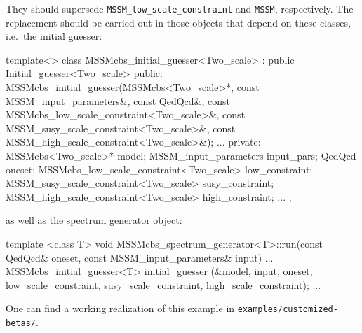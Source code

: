 \documentclass[final,3p,11pt,pdflatex]{elsarticle}
\newcommand{\code}[1]{\lstinline|#1|}  %
\begin{document}
They should supersede
\code{MSSM_low_scale_constraint} and \code{MSSM}, respectively.
The replacement should be carried out in
those objects that depend on these classes,
i.e.\ the initial guesser:
\begin{numlstlisting}
template<>
class MSSMcbs_initial_guesser<Two_scale> : public Initial_guesser<Two_scale> {
public:
  MSSMcbs_initial_guesser(MSSMcbs<Two_scale>*,
                          const MSSM_input_parameters&,
                          const QedQcd&,
                          const MSSMcbs_low_scale_constraint<Two_scale>&,
                          const MSSM_susy_scale_constraint<Two_scale>&,
                          const MSSM_high_scale_constraint<Two_scale>&);
  ...
private:
  MSSMcbs<Two_scale>* model;
  MSSM_input_parameters input_pars;
  QedQcd oneset;
  MSSMcbs_low_scale_constraint<Two_scale> low_constraint;
  MSSM_susy_scale_constraint<Two_scale> susy_constraint;
  MSSM_high_scale_constraint<Two_scale> high_constraint;
  ...
};
\end{numlstlisting}
as well as the spectrum generator object:
\begin{numlstlisting}
template <class T>
void MSSMcbs_spectrum_generator<T>::run(const QedQcd& oneset,
					const MSSM_input_parameters& input)
{
  ...
  MSSMcbs_initial_guesser<T> initial_guesser
    (&model, input, oneset,
     low_scale_constraint, susy_scale_constraint, high_scale_constraint);
  ...
}
\end{numlstlisting}
One can find a working realization of this example
in \code{examples/customized-betas/}.
\end{document}
